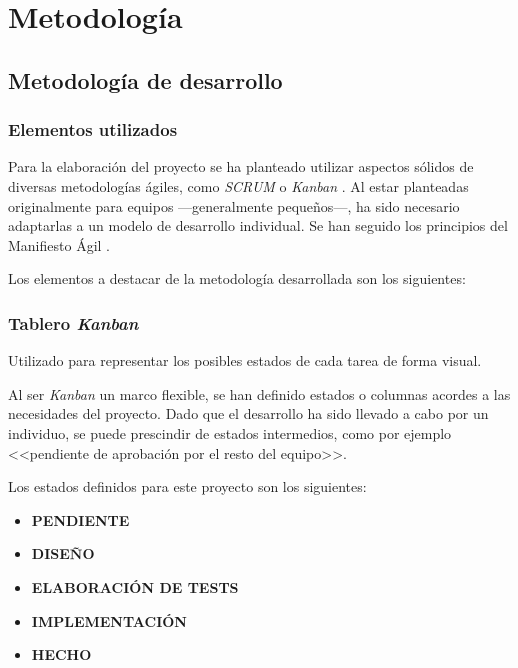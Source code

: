 \documentclass[10pt, a4paper]{aqademic}
\begin{document}
\chapter{Metodología}

\section{Metodología de desarrollo}

\subsection{Elementos utilizados}

Para la elaboración del proyecto se ha planteado utilizar aspectos sólidos de diversas metodologías ágiles, como \textit{SCRUM} \cite{schwaber2017scrum} o \textit{Kanban} \cite{kanban}. Al estar planteadas originalmente para equipos ---generalmente pequeños---, ha sido necesario adaptarlas a un modelo de desarrollo individual. Se han seguido los principios del Manifiesto Ágil \cite{beck2001agile}.

\medskip

Los elementos a destacar de la metodología desarrollada son los siguientes:

\subsection*{Tablero \textit{Kanban}}

Utilizado para representar los posibles estados de cada tarea de forma visual.

\medskip

Al ser \textit{Kanban} un marco flexible, se han definido estados o columnas acordes a las necesidades del proyecto. Dado que el desarrollo ha sido llevado a cabo por un individuo, se puede prescindir de estados intermedios, como por ejemplo <<pendiente de aprobación por el resto del equipo>>.

\medskip

Los estados definidos para este proyecto son los siguientes:

\begin{itemize}
	\item \textbf{PENDIENTE}
	\item \textbf{DISEÑO}
	\item \textbf{ELABORACIÓN DE TESTS}
	\item \textbf{IMPLEMENTACIÓN}
	\item \textbf{HECHO}
\end{itemize}
\end{document}
